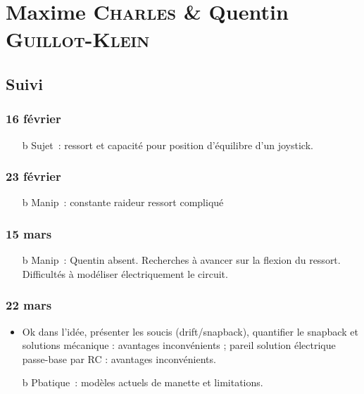 \documentclass[a4paper, 11pt, final, garamond]{book}
\begin{document}
\chapter{Maxime \textsc{Charles} \& Quentin \textsc{Guillot-Klein}}
\label{ch:charlesgk}

\section{Suivi}
\subsection{16 février}
\begin{itemize}
	\item[b]{Sujet}~: ressort et capacité pour position d'équilibre d'un joystick.
\end{itemize}

\subsection{23 février}
\begin{itemize}
	\item[b]{Manip}~: constante raideur ressort compliqué
\end{itemize}

\subsection{15 mars}
\begin{itemize}
	\item[b]{Manip}~: Quentin absent. Recherches à avancer sur la flexion du
	ressort. Difficultés à modéliser électriquement le circuit.
\end{itemize}

\subsection{22 mars}
\begin{itemize}
	\item Ok dans l'idée, présenter les soucis (drift/snapback), quantifier le
	      snapback et solutions mécanique : avantages inconvénients ; pareil
	      solution électrique passe-base par RC : avantages inconvénients.
	      \item[b]{Pbatique}~: modèles actuels de manette et limitations.
\end{itemize}
\end{document}
